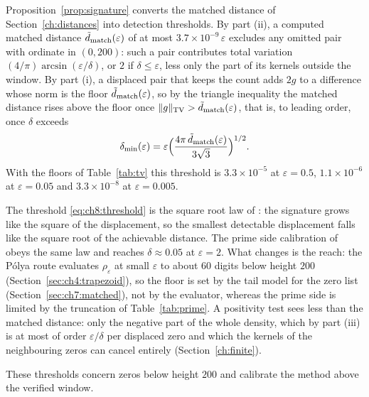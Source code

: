 Proposition~\ref{prop:signature} converts the matched distance of Section~\ref{ch:distances} into detection thresholds. By part (ii), a computed matched distance $\tilde d_{\rm match}(\varepsilon)$ of at most $3.7\times10^{-9}\,\varepsilon$ excludes any omitted pair with ordinate in $(0,200)$: such a pair contributes total variation $(4/\pi)\arcsin(\varepsilon/\delta)$, or $2$ if $\delta\le\varepsilon$, less only the part of its kernels outside the window. By part (i), a displaced pair that keeps the count adds $2g$ to a difference whose norm is the floor $\tilde d_{\rm match}(\varepsilon)$, so by the triangle inequality the matched distance rises above the floor once $\lVert g\rVert_{\mathrm{TV}}>\tilde d_{\rm match}(\varepsilon)$, that is, to leading order, once $\delta$ exceeds
\begin{equation}\label{eq:ch8:threshold}
\delta_{\min}(\varepsilon)=\varepsilon\Big(\frac{4\pi\,\tilde d_{\rm match}(\varepsilon)}{3\sqrt3}\Big)^{1/2}.
\end{equation}
With the floors of Table~\ref{tab:tv} this threshold is $3.3\times10^{-5}$ at $\varepsilon=0.5$, $1.1\times10^{-6}$ at $\varepsilon=0.05$ and $3.3\times10^{-8}$ at $\varepsilon=0.005$.

The threshold \eqref{eq:ch8:threshold} is the square root law of \cite[Proposition 19.7]{P26}: the signature grows like the square of the displacement, so the smallest detectable displacement falls like the square root of the achievable distance. The prime side calibration of \cite[Section 19.3.6]{P26} obeys the same law and reaches $\delta\approx0.05$ at $\varepsilon=2$. What changes is the reach: the P\'olya route evaluates $\rho_\varepsilon$ at small $\varepsilon$ to about $60$ digits below height $200$ (Section~\ref{sec:ch4:trapezoid}), so the floor is set by the tail model for the zero list (Section~\ref{sec:ch7:matched}), not by the evaluator, whereas the prime side is limited by the truncation of Table~\ref{tab:prime}. A positivity test sees less than the matched distance: only the negative part of the whole density, which by part (iii) is at most of order $\varepsilon/\delta$ per displaced zero and which the kernels of the neighbouring zeros can cancel entirely (Section~\ref{ch:finite}).

These thresholds concern zeros below height $200$ and calibrate the method above the verified window.
